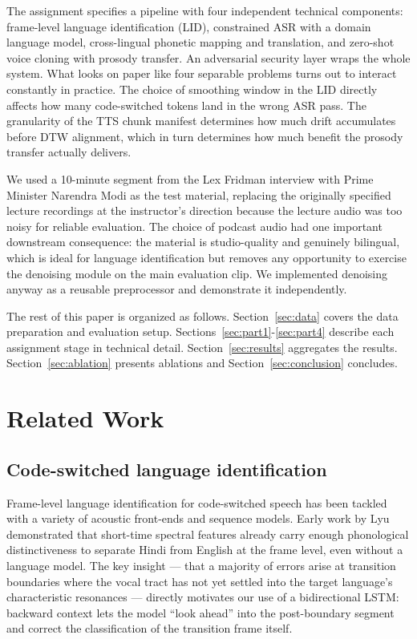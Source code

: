 \documentclass[10pt,twocolumn,letterpaper]{article}
\begin{document}
The assignment specifies a pipeline with four independent technical
components: frame-level language identification (LID), constrained
ASR with a domain language model, cross-lingual phonetic mapping and
translation, and zero-shot voice cloning with prosody transfer.  An
adversarial security layer wraps the whole system.  What looks on
paper like four separable problems turns out to interact constantly in
practice.  The choice of smoothing window in the LID directly affects
how many code-switched tokens land in the wrong ASR pass.  The
granularity of the TTS chunk manifest determines how much drift
accumulates before DTW alignment, which in turn determines how much
benefit the prosody transfer actually delivers.

We used a 10-minute segment from the Lex Fridman interview with Prime
Minister Narendra Modi as the test material, replacing the originally
specified lecture recordings at the instructor's direction because the
lecture audio was too noisy for reliable evaluation.  The choice of
podcast audio had one important downstream consequence: the material
is studio-quality and genuinely bilingual, which is ideal for
language identification but removes any opportunity to exercise the
denoising module on the main evaluation clip.  We implemented
denoising anyway as a reusable preprocessor and demonstrate it
independently.

The rest of this paper is organized as follows.  Section~\ref{sec:data}
covers the data preparation and evaluation setup.
Sections~\ref{sec:part1}-\ref{sec:part4} describe each assignment
stage in technical detail.  Section~\ref{sec:results} aggregates
the results.  Section~\ref{sec:ablation} presents ablations and
Section~\ref{sec:conclusion} concludes.

\section{Related Work}
\label{sec:related}

\subsection{Code-switched language identification}
Frame-level language identification for code-switched speech has been
tackled with a variety of acoustic front-ends and sequence models.
Early work by Lyu~\etal~\cite{lyu2010language} demonstrated that
short-time spectral features already carry enough phonological
distinctiveness to separate Hindi from English at the frame level,
even without a language model.  The key insight --- that a majority of
errors arise at transition boundaries where the vocal tract has not
yet settled into the target language's characteristic resonances ---
directly motivates our use of a bidirectional LSTM: backward context
lets the model ``look ahead'' into the post-boundary segment and
correct the classification of the transition frame itself.
\end{document}
